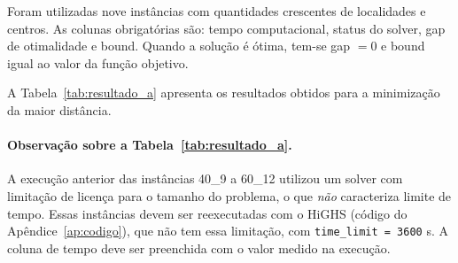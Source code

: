 \documentclass[12pt,a4paper]{article}
\begin{document}
Foram utilizadas nove instâncias com quantidades crescentes
de localidades e centros. As colunas obrigatórias são:
tempo computacional, status do solver, gap de otimalidade e
bound. Quando a solução é ótima, tem-se gap $=0$ e bound
igual ao valor da função objetivo.

A Tabela~\ref{tab:resultado_a} apresenta os resultados
obtidos para a minimização da maior distância.

\begin{table}[H]
\centering
\caption{Resultados do item (a) --- minimização da maior distância}
\label{tab:resultado_a}
\small
{}
\end{table}

\paragraph{Observação sobre a Tabela~\ref{tab:resultado_a}.}
A execução anterior das instâncias 40\_9 a 60\_12 utilizou
um solver com limitação de licença para o tamanho do problema,
o que \emph{não} caracteriza limite de tempo. Essas
instâncias devem ser reexecutadas com o HiGHS (código do
Apêndice~\ref{ap:codigo}), que não tem essa limitação, com
\texttt{time\_limit = 3600} s. A coluna de tempo deve ser
preenchida com o valor medido na execução.
\end{document}
